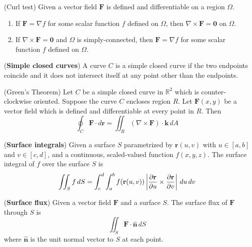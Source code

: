 \documentclass{huhtakm-template-book}
\begin{document}
\newpage
\begin{thm}(Curl test)
    Given a vector field $\mathbf{F}$ is defined and differentiable on a region $\Omega$.
    \begin{enumerate}
        \item If $\mathbf{F}=\nabla f$ for some scalar function $f$ defined on $\Omega$, then $\nabla\times\mathbf{F}=\mathbf{0}$ on $\Omega$.
        \item If $\nabla\times\mathbf{F}=\mathbf{0}$ and $\Omega$ is simply-connected, then $\mathbf{F}=\nabla f$ for some scalar function $f$ defined on $\Omega$.
    \end{enumerate}
\end{thm}
\begin{defn}(\textbf{Simple closed curves})
    A curve $C$ is a simple closed curve if the two endpoints coincide and it does not intersect itself at any point other than the endpoints.
\end{defn}
\begin{thm}(Green's Theorem)
    Let $C$ be a simple closed curve in $\mathbb{R}^{2}$ which is counter-clockwise oriented. Suppose the curve $C$ encloses region $R$. Let $\mathbf{F}(x,y)$ be a vector field which is defined and differentiable at every point in $R$. Then
    \begin{equation*}
        \oint_{C}\mathbf{F}\cdot d\mathbf{r}=\iint_{R}(\nabla\times\mathbf{F})\cdot\mathbf{k}\,dA
    \end{equation*}
\end{thm}
\begin{defn}(\textbf{Surface integrals})
    Given a surface $S$ parametrized by $\mathbf{r}(u,v)$ with $u\in[a,b]$ and $v\in[c,d]$, and a continuous, scaled-valued function $f(x,y,z)$. The surface integral of $f$ over the surface $S$ is
    \begin{equation*}
        \iint_{S}f\,dS=\int_{c}^{d}\int_{a}^{b}f(\mathbf{r}(u,v))\left|{\pdv{\mathbf{r}}{u}\times\pdv{\mathbf{r}}{v}}\right|\,du\,dv
    \end{equation*}
\end{defn}
\begin{defn}(\textbf{Surface flux})
    Given a vector field $\mathbf{F}$ and a surface $S$. The surface flux of $\mathbf{F}$ through $S$ is
    \begin{equation*}
        \iint_{S}\mathbf{F}\cdot\mathbf{\hat{n}}\,dS
    \end{equation*}
    where $\mathbf{\hat{n}}$ is the unit normal vector to $S$ at each point.
\end{defn}
\end{document}
